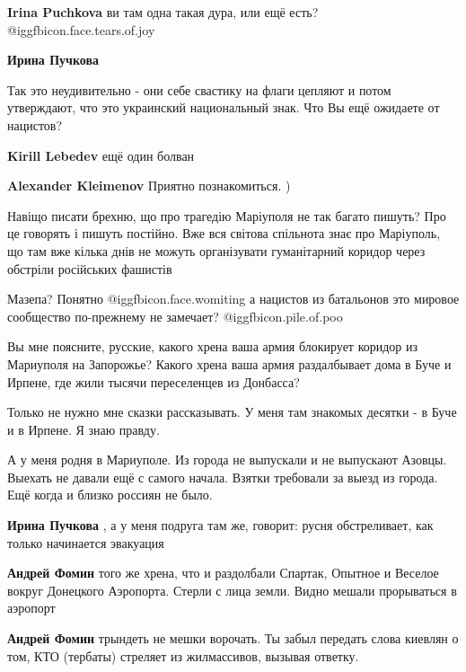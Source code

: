 \begin{itemize}
\begin{itemize}
\textbf{Irina Puchkova} ви там одна такая дура, или ещё есть?  @igg{fbicon.face.tears.of.joy} 

\textbf{Ирина Пучкова} 

Так это неудивительно - они себе свастику на флаги цепляют и потом утверждают,
что это украинский национальный знак. Что Вы ещё ожидаете от нацистов?

\textbf{Kirill Lebedev} ещё один болван

\textbf{Alexander Kleimenov} Приятно познакомиться. )
\end{itemize} %


Навіщо писати брехню, що про трагедію Маріуполя не так багато пишуть? Про це
говорять і пишуть постійно. Вже вся світова спільнота знає про Маріуполь, що
там вже кілька днів не можуть організувати гуманітарний коридор через обстріли
російських фашистів


Мазепа? Понятно @igg{fbicon.face.womiting} а нацистов из батальонов это мировое
сообщество по-прежнему не замечает?  @igg{fbicon.pile.of.poo} 


Вы мне поясните, русские, какого хрена ваша армия блокирует коридор из
Мариуполя на Запорожье? Какого хрена ваша армия раздалбывает дома в Буче и
Ирпене, где жили тысячи переселенцев из Донбасса?

Только не нужно мне сказки рассказывать. У меня там знакомых десятки - в Буче и
в Ирпене. Я знаю правду.

\begin{itemize} %

А у меня родня в Мариуполе. Из города не выпускали и не выпускают Азовцы.
Выехать не давали ещё с самого начала. Взятки требовали за выезд из города. Ещё
когда и близко россиян не было.

\textbf{Ирина Пучкова} , а у меня подруга там же, говорит: русня обстреливает, как только начинается эвакуация

\textbf{Андрей Фомин} того же хрена, что и раздолбали Спартак, Опытное и Веселое вокруг Донецкого Аэропорта. Стерли с лица земли. Видно мешали прорываться в аэропорт

\textbf{Андрей Фомин} трындеть не мешки ворочать. Ты забыл передать слова киевлян о том, КТО (тербаты) стреляет из жилмассивов, вызывая ответку.


\end{itemize}
\end{itemize}
